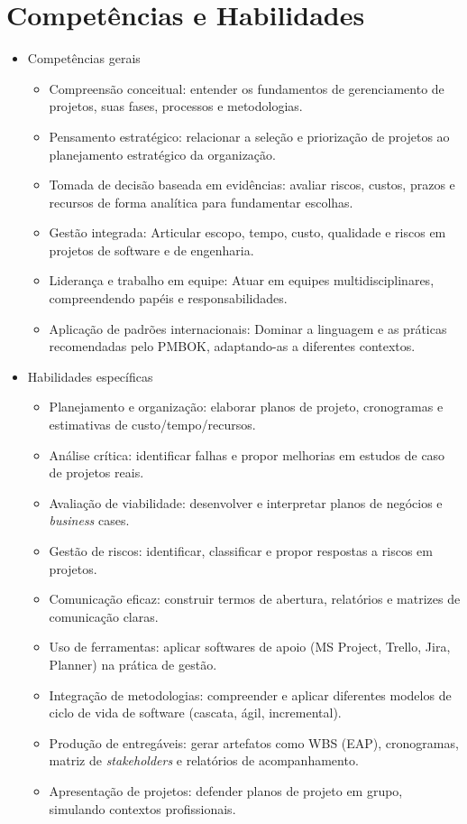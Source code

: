 \documentclass[a4paper, 12pt]{article}
\begin{document}
\section{Competências e Habilidades}

\begin{itemize}
    \item Competências gerais
        \begin{itemize}
            \item Compreensão conceitual: entender os fundamentos de gerenciamento de projetos, suas fases, processos e metodologias.
            \item Pensamento estratégico: relacionar a seleção e priorização de projetos ao planejamento estratégico da organização.
            \item Tomada de decisão baseada em evidências: avaliar riscos, custos, prazos e recursos de forma analítica para fundamentar escolhas.
            \item Gestão integrada: Articular escopo, tempo, custo, qualidade e riscos em projetos de software e de engenharia.
            \item Liderança e trabalho em equipe: Atuar em equipes multidisciplinares, compreendendo papéis e responsabilidades.
            \item Aplicação de padrões internacionais: Dominar a linguagem e as práticas recomendadas pelo PMBOK, adaptando-as a diferentes contextos.
        \end{itemize}
    \item Habilidades específicas
        \begin{itemize}
            \item Planejamento e organização: elaborar planos de projeto, cronogramas e estimativas de custo/tempo/recursos.
            \item Análise crítica: identificar falhas e propor melhorias em estudos de caso de projetos reais.
            \item Avaliação de viabilidade: desenvolver e interpretar planos de negócios e \textit{business} cases.
            \item Gestão de riscos: identificar, classificar e propor respostas a riscos em projetos.
            \item Comunicação eficaz: construir termos de abertura, relatórios e matrizes de comunicação claras.
            \item Uso de ferramentas: aplicar softwares de apoio (MS Project, Trello, Jira, Planner) na prática de gestão.
            \item Integração de metodologias: compreender e aplicar diferentes modelos de ciclo de vida de software (cascata, ágil, incremental).
            \item Produção de entregáveis: gerar artefatos como WBS (EAP), cronogramas, matriz de \textit{stakeholders} e relatórios de acompanhamento.
            \item Apresentação de projetos: defender planos de projeto em grupo, simulando contextos profissionais.
        \end{itemize}
\end{itemize}
\end{document}
